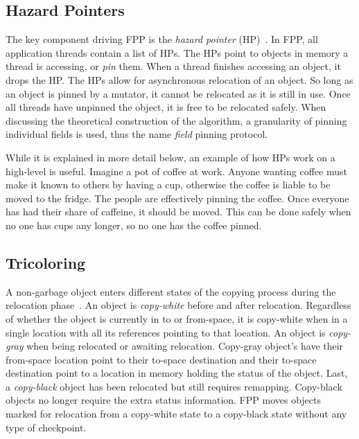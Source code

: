 \documentclass{sig-alternate}
\begin{document}
\subsection{Hazard Pointers}
\label{sec:fppHazard}

The key component driving FPP is the \emph{hazard pointer} (HP)~\cite{Osterlund:FPP}. 
In FPP, all application threads contain a list of HPs.
The HPs point to objects in memory a thread is accessing, or \emph{pin} them.
When a thread finishes accessing an object, it drops the HP.
The HPs allow for asynchronous relocation of an object. So long as an object
is pinned by a mutator, it cannot be relocated as it is still in use. Once all threads have
unpinned the object, it is free to be relocated safely.
When discussing the theoretical construction of the algorithm, a granularity of pinning 
individual fields is used, thus the name \emph{field} pinning protocol. 

While it is explained in more detail below, an example of how HPs 
work on a high-level is useful. Imagine a pot of coffee at work. Anyone 
wanting coffee must make it known to others by having a cup, otherwise the 
coffee is liable to be moved to the fridge. The people are effectively pinning the coffee.
Once everyone has had their share of caffeine, it should be moved. This can
be done safely when no one has cups any longer, so no one has the coffee pinned.



\subsection{Tricoloring}
\label{sec:fppColoring}

A non-garbage object enters different states of the copying process 
during the relocation phase~\cite{Osterlund:FPP}. An object is
\emph{copy-white} before and after relocation. Regardless of whether the object is
currently in to or from-space, it is copy-white when in a single location with all its
references pointing to that location. An object is \emph{copy-gray} when
being relocated or awaiting relocation. Copy-gray object's have their from-space location
point to their to-space destination and their to-space destination point to a location in
memory holding the status of the object. Last, a \emph{copy-black} object has
been relocated but still requires remapping. Copy-black objects no longer require the extra
status information. FPP moves objects marked for relocation from a copy-white state to
a copy-black state without any type of checkpoint.
\end{document}
